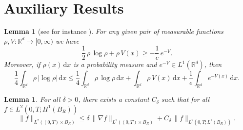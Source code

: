 \documentclass[reqno, 11pt]{amsart}
\numberwithin{equation}{section}
\newtheorem{lem}[thm]{Lemma}
\theoremstyle{definition}
\begin{document}

\section{Auxiliary Results}
\label{app:aux}
\begin{lem}[see for instance {\cite[Lemma D.2]{carrillo_skrzeczkowski_warnett_2024_stein}}]\label{lem:control_neg_log}
    For any given pair of measurable functions $\rho,V: \mathbb{R}^d \to [0,\infty)$ we have
    \begin{equation}\label{eq:pointwise_lower_bound}
        \frac{1}{2}\,\rho\, \log \rho + \rho\, V(x) \geq - \frac{1}{e} \, e^{-V}.
    \end{equation}
    Moreover, if $\rho(x)\,\mathrm{d} x$ is a probability measure and $e^{-V}\in L^1(\mathbb{R}^{d})$, then
    \begin{equation}\label{eq:lower_bound_negative_log}
        \frac{1}{4}\int_{\mathbb{R}^d} \rho\, |\log \rho| \,\mathrm{d} x \leq \frac{1}{4}\int_{\mathbb{R}^d} \rho\, \log \rho \,\mathrm{d} x + \int_{\mathbb{R}^d} \rho\, V(x) \,\mathrm{d} x + \frac{1}{e} \int_{\mathbb{R}^d} e^{-V(x)} \,\mathrm{d} x.
    \end{equation}
\end{lem}

\begin{lem}\label{lem:interpolation}
    For all $\delta > 0$, there exists a constant $C_{\delta}$ such that for all $f \in L^2(0,T; H^1(B_R))$
    \begin{equation}\label{eq:time_int_inequality}
        \|f\|_{L^2((0,T)\times B_R)} \leq \delta \, \|\nabla f\|_{L^2((0,T)\times B_R)} + C_{\delta}\, \|f\|_{L^2(0,T; L^1(B_R))}.
    \end{equation}
\end{lem}
\end{document}
